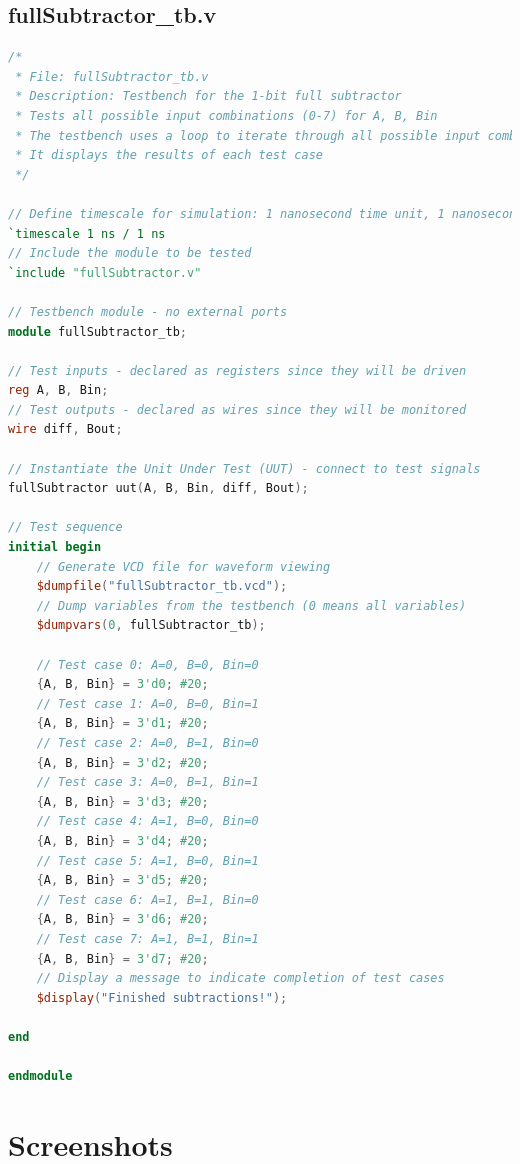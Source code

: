 \documentclass[a4paper,12pt]{article}
\begin{document}
\subsection*{fullSubtractor\_tb.v}
\begin{lstlisting}[language=Verilog]
/*
 * File: fullSubtractor_tb.v
 * Description: Testbench for the 1-bit full subtractor
 * Tests all possible input combinations (0-7) for A, B, Bin
 * The testbench uses a loop to iterate through all possible input combinations
 * It displays the results of each test case
 */
 
// Define timescale for simulation: 1 nanosecond time unit, 1 nanosecond precision
`timescale 1 ns / 1 ns
// Include the module to be tested
`include "fullSubtractor.v"

// Testbench module - no external ports
module fullSubtractor_tb;

// Test inputs - declared as registers since they will be driven
reg A, B, Bin;
// Test outputs - declared as wires since they will be monitored
wire diff, Bout;

// Instantiate the Unit Under Test (UUT) - connect to test signals
fullSubtractor uut(A, B, Bin, diff, Bout);

// Test sequence
initial begin
    // Generate VCD file for waveform viewing
    $dumpfile("fullSubtractor_tb.vcd");
    // Dump variables from the testbench (0 means all variables)
    $dumpvars(0, fullSubtractor_tb);
    
    // Test case 0: A=0, B=0, Bin=0
    {A, B, Bin} = 3'd0; #20;
    // Test case 1: A=0, B=0, Bin=1
    {A, B, Bin} = 3'd1; #20;
    // Test case 2: A=0, B=1, Bin=0
    {A, B, Bin} = 3'd2; #20;
    // Test case 3: A=0, B=1, Bin=1
    {A, B, Bin} = 3'd3; #20;
    // Test case 4: A=1, B=0, Bin=0
    {A, B, Bin} = 3'd4; #20;
    // Test case 5: A=1, B=0, Bin=1
    {A, B, Bin} = 3'd5; #20;
    // Test case 6: A=1, B=1, Bin=0
    {A, B, Bin} = 3'd6; #20;
    // Test case 7: A=1, B=1, Bin=1
    {A, B, Bin} = 3'd7; #20;
    // Display a message to indicate completion of test cases
    $display("Finished subtractions!");
    
end

endmodule
\end{lstlisting}

\section*{Screenshots}
\end{document}
